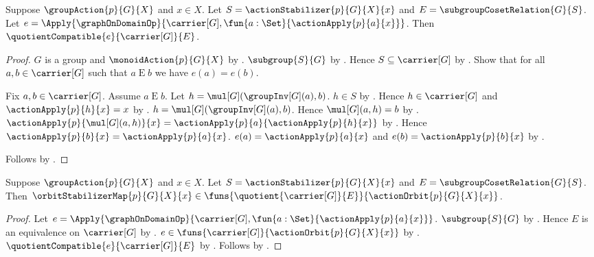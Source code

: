 \begin{lemma}\label{orbit_stabilizer_source_compatible}
    Suppose $\groupAction{p}{G}{X}$ and $x\in X$.
    Let $S=\actionStabilizer{p}{G}{X}{x}$ and
        $E=\subgroupCosetRelation{G}{S}$.
    Let
        $e=\Apply{\graphOnDomainOp}{
            \carrier[G],\fun{a:\Set}{\actionApply{p}{a}{x}}}$.
    Then $\quotientCompatible{e}{\carrier[G]}{E}$.
\end{lemma}
\begin{proof}
    $G$ is a group and $\monoidAction{p}{G}{X}$ by
        .
    $\subgroup{S}{G}$ by .
    Hence $S\subseteq\carrier[G]$ by .
    Show that for all $a,b\in\carrier[G]$ such that $a\mathrel{E}b$
        we have $e(a)=e(b)$.
    \begin{subproof}
        Fix $a,b\in\carrier[G]$.
        Assume $a\mathrel{E}b$.
        Let $h=\mul[G](\groupInv[G](a),b)$.
        $h\in S$ by .
        Hence $h\in\carrier[G]$ and
            $\actionApply{p}{h}{x}=x$ by
            .
        $h=\mul[G](\groupInv[G](a),b)$.
        Hence $\mul[G](a,h)=b$ by .
        $\actionApply{p}{\mul[G](a,h)}{x}
            =\actionApply{p}{a}{\actionApply{p}{h}{x}}$ by
            .
        Hence $\actionApply{p}{b}{x}=\actionApply{p}{a}{x}$.
        $e(a)=\actionApply{p}{a}{x}$ and
            $e(b)=\actionApply{p}{b}{x}$ by
            .
    \end{subproof}
    Follows by .
\end{proof}

\begin{proposition}\label{orbit_stabilizer_map_type}
    Suppose $\groupAction{p}{G}{X}$ and $x\in X$.
    Let $S=\actionStabilizer{p}{G}{X}{x}$ and
        $E=\subgroupCosetRelation{G}{S}$.
    Then $\orbitStabilizerMap{p}{G}{X}{x}\in
        \funs{\quotient{\carrier[G]}{E}}
            {\actionOrbit{p}{G}{X}{x}}$.
\end{proposition}
\begin{proof}
    Let
        $e=\Apply{\graphOnDomainOp}{
            \carrier[G],\fun{a:\Set}{\actionApply{p}{a}{x}}}$.
    $\subgroup{S}{G}$ by .
    Hence $E$ is an equivalence on $\carrier[G]$ by
        .
    $e\in\funs{\carrier[G]}{\actionOrbit{p}{G}{X}{x}}$ by
        .
    $\quotientCompatible{e}{\carrier[G]}{E}$ by
        .
    Follows by .
\end{proof}

